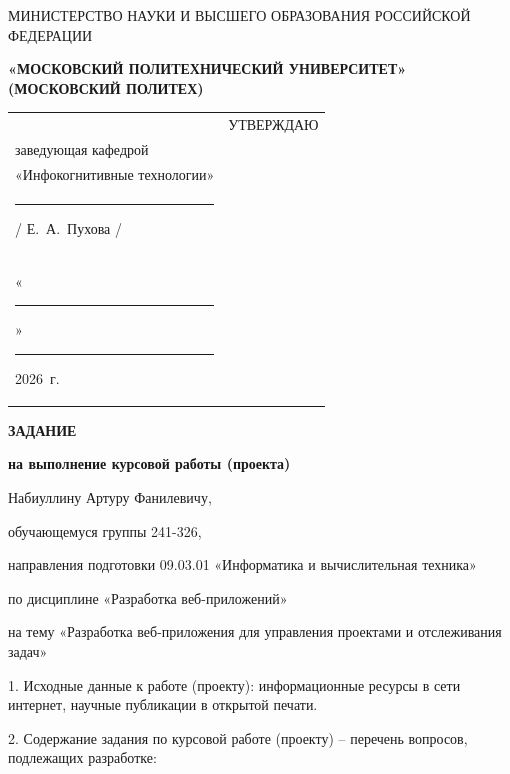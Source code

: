 \documentclass[14pt, a4paper]{extarticle}
\begin{document}
\pagestyle{empty}


\begin{center}
    {\small МИНИСТЕРСТВО НАУКИ И ВЫСШЕГО ОБРАЗОВАНИЯ РОССИЙСКОЙ ФЕДЕРАЦИИ}


    {\small \textbf{«МОСКОВСКИЙ ПОЛИТЕХНИЧЕСКИЙ УНИВЕРСИТЕТ»}} \\
    {\small \textbf{(МОСКОВСКИЙ ПОЛИТЕХ)}}
\end{center}

\begin{tabularx}{\textwidth}{@{} p{} p{} @{}}
     &
    \raggedright
    УТВЕРЖДАЮ                          \\
    заведующая кафедрой                \\
    «Инфокогнитивные технологии»       \\[0.3cm]

    \rule{3cm}{0.4pt} / Е.~А.~Пухова / \\[0.1cm]

    «\rule{0.8cm}{0.4pt}» \rule{3cm}{0.4pt} 2026~г.
\end{tabularx}


\begin{center}

    { \large \textbf{ЗАДАНИЕ}}

    \textbf{на выполнение курсовой работы (проекта)}

    Набиуллину Артуру Фанилевичу,

\end{center}

обучающемуся группы 241-326,

направления подготовки 09.03.01 «Информатика и вычислительная техника»

по дисциплине «Разработка веб-приложений»

на тему «Разработка веб-приложения для управления проектами и отслеживания задач»

1. Исходные данные к работе (проекту): информационные ресурсы в сети
интернет, научные публикации в открытой печати.

2. Содержание задания по курсовой работе (проекту) -- перечень вопросов,
подлежащих разработке:
\end{document}
